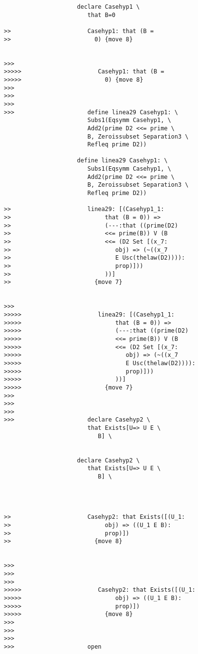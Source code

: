\documentclass[12pt]{article}
\begin{document}
\begin{verbatim}
                     declare Casehyp1 \
                        that B=0

>>                      Casehyp1: that (B =
>>                        0) {move 8}


>>>
>>>>>                      Casehyp1: that (B =
>>>>>                        0) {move 8}
>>>
>>>
>>>
>>>                     define linea29 Casehyp1: \
                        Subs1(Eqsymm Casehyp1, \
                        Add2(prime D2 <<= prime \
                        B, Zeroissubset Separation3 \
                        Refleq prime D2))

                     define linea29 Casehyp1: \
                        Subs1(Eqsymm Casehyp1, \
                        Add2(prime D2 <<= prime \
                        B, Zeroissubset Separation3 \
                        Refleq prime D2))

>>                      linea29: [(Casehyp1_1:
>>                           that (B = 0)) =>
>>                           (---:that ((prime(D2)
>>                           <<= prime(B)) V (B
>>                           <<= (D2 Set [(x_7:
>>                              obj) => (~((x_7
>>                              E Usc(thelaw(D2)))):
>>                              prop)]))
>>                           ))]
>>                        {move 7}


>>>
>>>>>                      linea29: [(Casehyp1_1:
>>>>>                           that (B = 0)) =>
>>>>>                           (---:that ((prime(D2)
>>>>>                           <<= prime(B)) V (B
>>>>>                           <<= (D2 Set [(x_7:
>>>>>                              obj) => (~((x_7
>>>>>                              E Usc(thelaw(D2)))):
>>>>>                              prop)]))
>>>>>                           ))]
>>>>>                        {move 7}
>>>
>>>
>>>
>>>                     declare Casehyp2 \
                        that Exists[U=> U E \
                           B] \
                        

                     declare Casehyp2 \
                        that Exists[U=> U E \
                           B] \
                        



>>                      Casehyp2: that Exists([(U_1:
>>                           obj) => ((U_1 E B):
>>                           prop)])
>>                        {move 8}


>>>
>>>
>>>
>>>>>                      Casehyp2: that Exists([(U_1:
>>>>>                           obj) => ((U_1 E B):
>>>>>                           prop)])
>>>>>                        {move 8}
>>>
>>>
>>>
>>>                     open


\end{verbatim}
\end{document}
